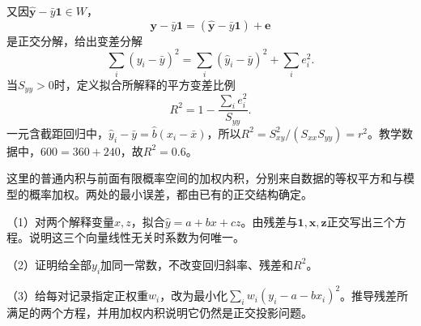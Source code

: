 又因\(\widehat{\boldsymbol y}-\bar y\boldsymbol1\in W\)，
\[
 \boldsymbol y-\bar y\boldsymbol1
 =(\widehat{\boldsymbol y}-\bar y\boldsymbol1)+\boldsymbol e
\]
是正交分解，给出{\heiti 变差分解}
\begin{equation}\label{eq:prob-regression-decomposition}
 \sum_i(y_i-\bar y)^2=\sum_i(\widehat y_i-\bar y)^2+\sum_ie_i^2.
\end{equation}
当\(S_{yy}>0\)时，定义拟合所解释的平方变差比例
\[
 R^2=1-\frac{\sum_ie_i^2}{S_{yy}}.
\]
一元含截距回归中，\(\widehat y_i-\bar y=\widehat b(x_i-\bar x)\)，所以\(R^2=S_{xy}^2/(S_{xx}S_{yy})=r^2\)。教学数据中，\(600=360+240\)，故\(R^2=0.6\)。

这里的普通内积与前面有限概率空间的加权内积，分别来自数据的等权平方和与模型的概率加权。两处的最小误差，都由已有的正交结构确定。

\begin{exercise}
\mbox{}\par\nobreak

（1）对两个解释变量\(x,z\)，拟合\(\widehat y=a+bx+cz\)。由残差与\(\boldsymbol1,\boldsymbol x,\boldsymbol z\)正交写出三个方程。说明这三个向量线性无关时系数为何唯一。

（2）证明给全部\(y_i\)加同一常数，不改变回归斜率、残差和\(R^2\)。

（3）给每对记录指定正权重\(w_i\)，改为最小化\(\sum_iw_i(y_i-a-bx_i)^2\)。推导残差所满足的两个方程，并用加权内积说明它仍然是正交投影问题。
\end{exercise}
